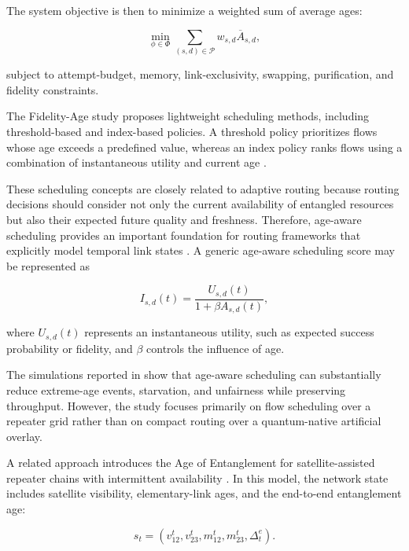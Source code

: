 The system objective is then to minimize a weighted sum of average ages:

\begin{equation}
    \min_{\phi \in \Phi}
    \sum_{(s,d)\in\mathcal{P}}
    w_{s,d}
    \overline{A}_{s,d},
\end{equation}

subject to attempt-budget, memory, link-exclusivity, swapping, purification, and fidelity constraints.

The Fidelity-Age study proposes lightweight scheduling methods, including threshold-based and index-based policies. A threshold policy prioritizes flows whose age exceeds a predefined value, whereas an index policy ranks flows using a combination of instantaneous utility and current age \cite{ercetin2026fidelityage}.

These scheduling concepts are closely related to adaptive routing because routing decisions should consider not only the current availability of entangled resources but also their expected future quality and freshness. Therefore, age-aware scheduling provides an important foundation for routing frameworks that explicitly model temporal link states \cite{halder2024optimal,ercetin2026fidelityage,park2025quantum,chen2023adaptive}.
A generic age-aware scheduling score may be represented as

\begin{equation}
    I_{s,d}(t)
    =
    \frac{U_{s,d}(t)}
    {1+\beta A_{s,d}(t)},
\end{equation}

where $U_{s,d}(t)$ represents an instantaneous utility, such as expected success probability or fidelity, and $\beta$ controls the influence of age.

The simulations reported in \cite{ercetin2026fidelityage} show that age-aware scheduling can substantially reduce extreme-age events, starvation, and unfairness while preserving throughput. However, the study focuses primarily on flow scheduling over a repeater grid rather than on compact routing over a quantum-native artificial overlay.

A related approach introduces the Age of Entanglement for satellite-assisted repeater chains with intermittent availability \cite{ceran2026age}. In this model, the network state includes satellite visibility, elementary-link ages, and the end-to-end entanglement age:

\begin{equation}
    s_t
    =
    \left(
    v_{12}^{t},
    v_{23}^{t},
    m_{12}^{t},
    m_{23}^{t},
    \Delta_{t}^{e}
    \right).
\end{equation}


